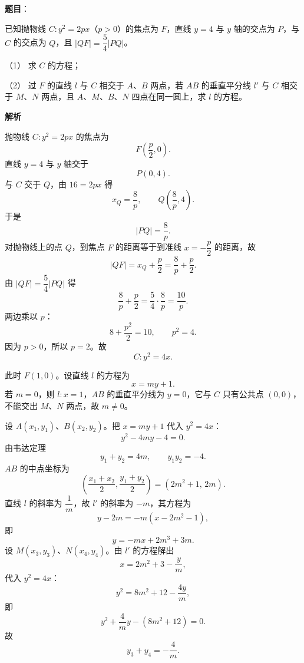 \begin{answer}

\textbf{题目}：

已知抛物线 $C:y^2=2px$（$p>0$）的焦点为 $F$，直线 $y=4$ 与 $y$ 轴的交点为 $P$，与 $C$ 的交点为 $Q$，且 $|QF|=\dfrac54|PQ|$。

（1） 求 $C$ 的方程；

（2） 过 $F$ 的直线 $l$ 与 $C$ 相交于 $A$、$B$ 两点，若 $AB$ 的垂直平分线 $l'$ 与 $C$ 相交于 $M$、$N$ 两点，且 $A$、$M$、$B$、$N$ 四点在同一圆上，求 $l$ 的方程。

\textbf{解析}


抛物线 $C:y^2=2px$ 的焦点为
\nopagebreak[4]
\[F\left(\frac p2,0\right).\]
直线 $y=4$ 与 $y$ 轴交于
\nopagebreak[4]
\[P(0,4).\]
与 $C$ 交于 $Q$，由 $16=2px$ 得
\nopagebreak[4]
\[x_Q=\frac8p,\qquad Q\left(\frac8p,4\right).\]
于是
\nopagebreak[4]
\[|PQ|=\frac8p.\]
对抛物线上的点 $Q$，到焦点 $F$ 的距离等于到准线 $x=-\dfrac p2$ 的距离，故
\nopagebreak[4]
\[|QF|=x_Q+\frac p2=\frac8p+\frac p2.\]
由 $|QF|=\dfrac54|PQ|$ 得
\nopagebreak[4]
\[\frac8p+\frac p2=\frac54\cdot\frac8p=\frac{10}{p}.\]
两边乘以 $p$：
\nopagebreak[4]
\[8+\frac{p^2}{2}=10,\qquad p^2=4.\]
因为 $p>0$，所以 $p=2$。故
\nopagebreak[4]
\[C:y^2=4x.\]


此时 $F(1,0)$。设直线 $l$ 的方程为
\nopagebreak[4]
\[x=my+1.\]
若 $m=0$，则 $l:x=1$，$AB$ 的垂直平分线为 $y=0$，它与 $C$ 只有公共点 $(0,0)$，不能交出 $M$、$N$ 两点，故 $m\neq0$。

设 $A(x_1,y_1)$、$B(x_2,y_2)$。把 $x=my+1$ 代入 $y^2=4x$：
\nopagebreak[4]
\[y^2-4my-4=0.\]
由韦达定理
\nopagebreak[4]
\[y_1+y_2=4m,\qquad y_1y_2=-4.\]
$AB$ 的中点坐标为
\nopagebreak[4]
\[\left(\frac{x_1+x_2}{2},\frac{y_1+y_2}{2}\right)
=(2m^2+1,\,2m).\]
直线 $l$ 的斜率为 $\dfrac1m$，故 $l'$ 的斜率为 $-m$，其方程为
\nopagebreak[4]
\[y-2m=-m(x-2m^2-1),\]
即
\nopagebreak[4]
\[y=-mx+2m^3+3m.\]
设 $M(x_3,y_3)$、$N(x_4,y_4)$。由 $l'$ 的方程解出
\nopagebreak[4]
\[x=2m^2+3-\frac ym,\]
代入 $y^2=4x$：
\nopagebreak[4]
\[y^2=8m^2+12-\frac{4y}{m},\]
即
\nopagebreak[4]
\[y^2+\frac4m y-(8m^2+12)=0.\]
故
\nopagebreak[4]
\[y_3+y_4=-\frac4m.\]


\end{answer}
